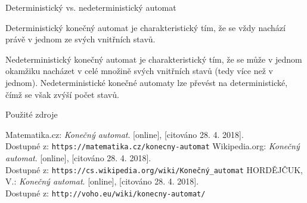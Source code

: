 \documentclass[utf8x]{beamer}
\begin{document}
\begin{frame}{Deterministický vs. nedeterministický automat}
    \begin{block}{Deterministický konečný automat}
        je charakteristický tím, že se vždy nachází právě v jednom ze svých vnitřních stavů.
    \end{block}
    
    \begin{block}{Nedeterministický konečný automat}
        je charakteristický tím, že se může v jednom okamžiku nacházet v celé množině svých vnitřních stavů (tedy více než v jednom). Nedeterministické konečné automaty lze převést na deterministické, čímž se však zvýší počet stavů.
    \end{block}
\end{frame}

\appendix

\begin{frame}{Použité zdroje}
\begin{thebibliography}{}

\bibitem{} Matematika.cz:
    \emph{Konečný automat}. [online], [citováno 28. 4. 2018].\\
    Dostupné z: \texttt{https://matematika.cz/konecny-automat}
\vspace{2mm}
\bibitem{} Wikipedia.org:
    \emph{Konečný automat}. [online], [citováno 28. 4. 2018].\\
    Dostupné z: \texttt{https://cs.wikipedia.org/wiki/Konečný\_automat}
\vspace{2mm}
\bibitem{} HORDĚJČUK, V.:
    \emph{Konečný automat}. [online], [citováno 28. 4. 2018].\\
    Dostupné z: \texttt{http://voho.eu/wiki/konecny-automat/}

\end{thebibliography}
\end{frame}
\end{document}
